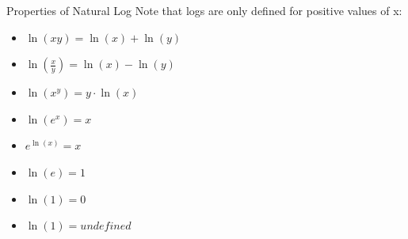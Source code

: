 \documentclass[aspectratio=169]{beamer}
\begin{document}
\begin{frame}{Properties of Natural Log}\label{main1}
\hypertarget{naturallogslide}{}
Note that logs are only defined for positive values of x:
\begin{itemize}
\begin{itemize}
    \item $\ln(xy) = \ln(x) + \ln(y)$
    \item $\ln\left(\frac{x}{y}\right) = \ln(x) - \ln(y)$
    \item $\ln(x^y) = y \cdot \ln(x)$
    \item $\ln(e^x) = x$
    \item $e^{\ln(x)} = x$
    \item $\ln(e) = 1$
    \item $\ln(1) = 0$
    \item $\ln(1) = undefined$
\end{itemize}
\end{itemize}
\end{frame}
\end{document}
